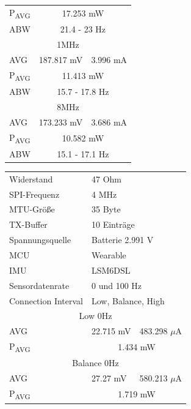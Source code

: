 \begin{figure}[!hbtp]
\begin{minipage}{0.5\textwidth}
\begin{tabular}{|l|l|l|}
      P\textsubscript{AVG} & \multicolumn{2}{c|}{17.253 mW}\\
      ABW & \multicolumn{2}{c|}{21.4 - 23 Hz}\\
      \hline
      \multicolumn{3}{|c|}{1MHz}\\
      AVG & 187.817 mV & 3.996 mA\\
      P\textsubscript{AVG} & \multicolumn{2}{c|}{11.413 mW}\\
      ABW & \multicolumn{2}{c|}{15.7 - 17.8 Hz}\\
      \hline
      \multicolumn{3}{|c|}{8MHz}\\
      AVG & 173.233 mV & 3.686 mA\\
      P\textsubscript{AVG} & \multicolumn{2}{c|}{10.582 mW}\\
      ABW & \multicolumn{2}{c|}{15.1 - 17.1 Hz}\\
      \hline
    \end{tabular}
    \label{tab:test3}
  \end{minipage}
  \begin{minipage}{0.5\textwidth}
    \centering
    \begin{tabular}{|l|l|l|}
      \hline
      Widerstand & \multicolumn{2}{l|}{47 Ohm}\\
      SPI-Frequenz & \multicolumn{2}{l|}{4 MHz}\\
      MTU-Größe & \multicolumn{2}{l|}{35 Byte}\\
      TX-Buffer & \multicolumn{2}{l|}{10 Einträge}\\
      Spannungsquelle & \multicolumn{2}{l|}{Batterie 2.991 V}\\
      MCU & \multicolumn{2}{l|}{Wearable}\\
      IMU & \multicolumn{2}{l|}{LSM6DSL}\\
      Sensordatenrate & \multicolumn{2}{l|}{0 und 100 Hz}\\
      Connection Interval & \multicolumn{2}{l|}{Low, Balance, High}\\
      \hline
      \multicolumn{3}{|c|}{Low 0Hz}\\
      AVG & 22.715 mV & 483.298 $\mu$A\\
      P\textsubscript{AVG} & \multicolumn{2}{c|}{1.434 mW}\\
      \hline
      \multicolumn{3}{|c|}{Balance 0Hz}\\
      AVG & 27.27 mV & 580.213 $\mu$A\\
      P\textsubscript{AVG} & \multicolumn{2}{c|}{1.719 mW}\\

\end{tabular}
\end{minipage}
\end{figure}
